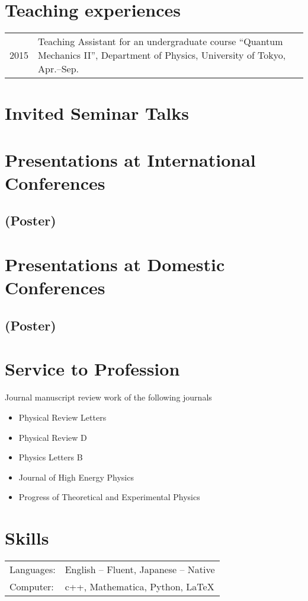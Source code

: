 \documentclass[12pt]{article}
\begin{document}
\section*{Teaching experiences}
\begin{table}[H]
  \begin{tabular}{lp{6in}}
    2015 & Teaching Assistant for an undergraduate course ``Quantum Mechanics II'', Department of Physics, University of Tokyo, Apr.--Sep.
  \end{tabular}
\end{table}



\nocite{*}

\section*{Invited Seminar Talks}

\section*{Presentations at International Conferences}

\subsection*{(Poster)}

\section*{Presentations at Domestic Conferences}

\subsection*{(Poster)}

\section*{Service to Profession}
\vspace*{1em}
Journal manuscript review work of the following journals
\begin{itemize}
  \setlength\itemsep{0em}
  \item Physical Review Letters
  \item Physical Review D
  \item Physics Letters B
  \item Journal of High Energy Physics
  \item Progress of Theoretical and Experimental Physics
\end{itemize}

\section*{Skills}
\begin{table}[H]
  \begin{tabular}{lp{6in}}
    Languages: & English -- Fluent, Japanese -- Native \\
    Computer: & c++, Mathematica, Python, LaTeX
  \end{tabular}
\end{table}
\end{document}
